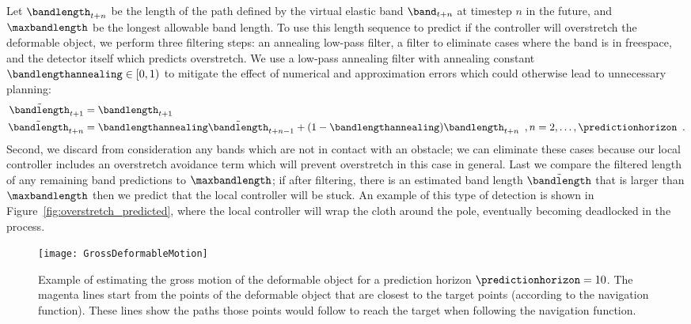Let $\bandlength_{t+n}$ be the length of the path defined by the virtual elastic band $\band_{t+n}$ at timestep $n$ in the future, and $\maxbandlength$ be the longest allowable band length. To use this length sequence to predict if the controller will overstretch the deformable object, we perform three filtering steps: an annealing low-pass filter, a filter to eliminate cases where the band is in freespace, and the detector itself which predicts overstretch. We use a low-pass annealing filter with annealing constant $\bandlengthannealing \in [0, 1)$ to mitigate the effect of numerical and approximation errors which could otherwise lead to unnecessary planning:
\begin{equation}
    \begin{split}
        \tilde \bandlength_{t + 1} &= \bandlength_{t + 1} \\
        \tilde \bandlength_{t + n} &= \bandlengthannealing \tilde \bandlength_{t + n - 1} + (1 - \bandlengthannealing) \bandlength_{t + n} \enspace ,  n = 2, \dots, \predictionhorizon \enspace .
    \end{split}
\end{equation}
Second, we discard from consideration any bands which are not in contact with an obstacle; we can eliminate these cases because our local controller includes an overstretch avoidance term which will prevent overstretch in this case in general. Last we compare the filtered length of any remaining band predictions to $\maxbandlength$; if after filtering, there is an estimated band length $\tilde \bandlength$ that is larger than $\maxbandlength$ then we predict that the local controller will be stuck. An example of this type of detection is shown in Figure~\ref{fig:overstretch_predicted}, where the local controller will wrap the cloth around the pole, eventually becoming deadlocked in the process.




\begin{figure}
    \centering
    \texttt{[image: GrossDeformableMotion]}
    \caption{Example of estimating the gross motion of the deformable object for a prediction horizon $\predictionhorizon = 10$. The magenta lines start from the points of the deformable object that are closest to the target points (according to the navigation function). These lines show the paths those points would follow to reach the target when following the navigation function.}
    \label{fig:gross_deformable_motion}
\end{figure}

